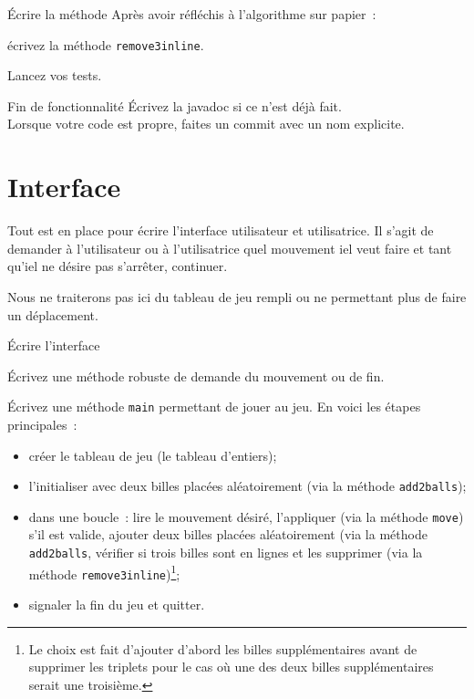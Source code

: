 \documentclass[a4paper,11pt]{style-esi/td}
\newcommand{\findefonctionnalite}{
\begin{infoit}{Fin de fonctionnalité}
	Écrivez la javadoc si ce n'est déjà fait.\\  
	Lorsque votre code est propre, faites un commit avec un nom explicite. 
\end{infoit}
}
\begin{document}
\begin{Exercice}{Écrire la méthode}
	Après avoir réfléchis à l'algorithme sur papier : 
	\begin{steps}
	\item écrivez la méthode \texttt{remove3inline}.
	\item Lancez vos tests. 
	\end{steps}
\end{Exercice}

\findefonctionnalite 



\section{Interface}

Tout est en place pour écrire l'interface utilisateur et utilisatrice. Il
s'agit de demander à l'utilisateur ou à l'utilisatrice quel mouvement iel veut
faire et tant qu'iel ne désire pas s'arrêter, continuer. 

Nous ne traiterons pas ici du tableau de jeu rempli ou ne permettant plus de
faire un déplacement. 

\begin{Exercice}{Écrire l'interface}
	\begin{steps}
	\item Écrivez une méthode robuste de demande du mouvement ou de fin.
	\item Écrivez une méthode \texttt{main} permettant de jouer au jeu. En voici 
		les étapes principales~:
		\begin{itemize}
			\item créer le tableau de jeu (le tableau d'entiers);
			\item l'initialiser avec deux billes placées aléatoirement (via la 
				méthode \texttt{add2balls});
			\item dans une boucle~: lire le mouvement désiré, 
				l'appliquer (via la méthode \texttt{move}) s'il est valide, 
				ajouter deux billes placées aléatoirement
				(via la méthode \texttt{add2balls},
				vérifier si trois billes sont en lignes et les supprimer 
				(via la méthode \texttt{remove3inline})\footnote{Le choix est 
				fait d'ajouter d'abord les billes supplémentaires avant de 
				supprimer les triplets pour le cas où une des deux billes 
				supplémentaires serait une troisième.}; 
			\item signaler la fin du jeu et quitter. 
		\end{itemize}
	\end{steps}
\end{Exercice}
\end{document}
